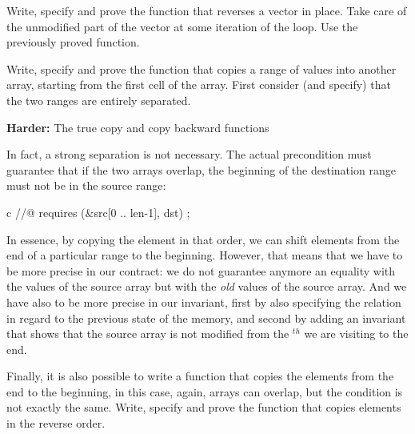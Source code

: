 



Write, specify and prove the function that reverses a vector in place. Take
care of the unmodified part of the vector at some iteration of the loop.
Use the previously proved  function.








Write, specify and prove the function  that copies a range
of values into another array, starting from the first cell of the array.
First consider (and specify) that the two ranges are entirely separated.




\textbf{Harder:} The true copy and copy backward functions


In fact, a strong separation is not necessary. The actual precondition must
guarantee that if the two arrays overlap, the beginning of the destination
range must not be in the source range:


\begin{CodeBlock}{c}
//@ requires \separated(&src[0 .. len-1], dst) ;
\end{CodeBlock}


In essence, by copying the element in that order, we can shift elements from
the end of a particular range to the beginning. However, that means that we
have to be more precise in our contract: we do not guarantee anymore an equality
with the values of the source array but with the \emph{old} values of the
source array. And we have also to be more precise in our invariant, first by
also specifying the relation in regard to the previous state of the memory, and
second by adding an invariant that shows that the source array is not modified
from the $^{th}$ we are visiting to the end.


Finally, it is also possible to write a function that copies the elements from
the end to the beginning, in this case, again, arrays can overlap, but the
condition is not exactly the same. Write, specify and prove the function
 that copies elements in the reverse order.


